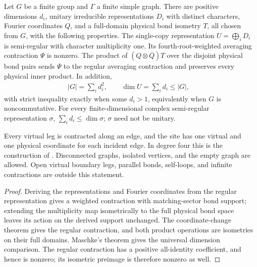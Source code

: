 \begin{theorem}%
    \label{thm:peps_graph_minimal_semiregular_equivalence}
    \leanok
    Let $G$ be a finite group and $\Gamma$ a finite simple graph. There are
    positive dimensions $d_i$, unitary irreducible representations $D_i$
    with distinct characters, Fourier coordinates $Q$, and a full-domain
    physical bond isometry $T$, all chosen from $G$, with the following
    properties. The single-copy representation $U=\bigoplus_iD_i$ is
    semi-regular with character multiplicity one. Its fourth-root-weighted
    averaging contraction $\Psi$ is nonzero. The product of
    $(Q\otimes\overline Q)T$ over the disjoint physical bond pairs sends
    $\Psi$ to the regular averaging contraction and preserves every
    physical inner product. In addition,
    \begin{align}
        |G|=\sum_i d_i^2,\qquad \dim U=\sum_i d_i\leq |G|,
    \end{align}
    with strict inequality exactly when some $d_i>1$, equivalently when $G$
    is noncommutative. For every
    finite-dimensional complex semi-regular representation $\sigma$,
    $\sum_i d_i\leq\dim\sigma$; $\sigma$ need not be unitary.

    Every virtual leg is contracted along an edge, and the site has one
    virtual and one physical coordinate for each incident edge. In degree
    four this is the construction of \cite[Section~7]{Schuch2010PEPS}.
    Disconnected graphs, isolated vertices, and the empty graph are allowed.
    Open virtual boundary legs, parallel bonds, self-loops, and infinite
    contractions are outside this statement.
\end{theorem}
\begin{proof}\leanok
    Deriving the representations and Fourier coordinates from the regular
    representation gives a weighted contraction with matching-sector
    bond support; extending the multiplicity map isometrically to the full
    physical bond space leaves its action on the derived support unchanged.
    The coordinate-change theorem gives the regular contraction, and
    both product operations are isometries on their full domains.
    Maschke's theorem gives the universal dimension comparison. The regular
    contraction has a positive all-identity coefficient, and hence is
    nonzero; its isometric preimage is therefore nonzero as well.
\end{proof}
